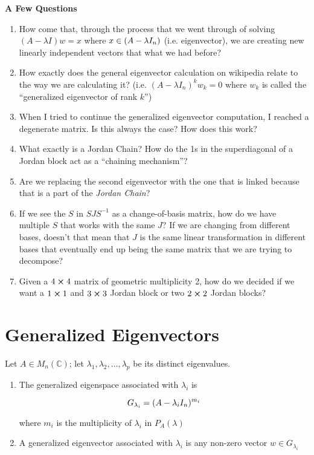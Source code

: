 \begin{tcolorbox}
	\textbf{A Few Questions}

	\begin{enumerate}
		\item How come that, through the process that we went through of solving $(A - \lambda I)w = x$ where $x \in \null(A - \lambda I_n)$ (i.e. eigenvector), we are creating new linearly independent vectors that what we had before?
		\item How exactly does the general eigenvector calculation on wikipedia relate to the way we are calculating it? (i.e. $(A - \lambda I_n)^k w_k = 0$ where $w_k$ is called the ``generalized eigenvector of rank $k$'')
		\item When I tried to continue the generalized eigenvector computation, I reached a degenerate matrix. Is this always the case? How does this work?
		\item What exactly is a Jordan Chain? How do the 1s in the superdiagonal of a Jordan block act as a ``chaining mechanism''?
		\item Are we replacing the second eigenvector with the one that is linked because that is a part of the \textit{Jordan Chain}?
		\item If we see the $S$ in $SJS^{-1}$ as a change-of-basis matrix, how do we have multiple $S$ that works with the same $J$? If we are changing from different bases, doesn't that mean that $J$ is the same linear transformation in different bases that eventually end up being the same matrix that we are trying to decompose?
		\item Given a $4 \cross 4$ matrix of geometric multiplicity 2, how do we decided if we want a $1\cross 1$ and $3 \cross 3$ Jordan block or two $2 \cross 2$ Jordan blocks?
	\end{enumerate}
\end{tcolorbox}

\section{Generalized Eigenvectors}

\begin{definition}
	Let $A \in M_n(\mathbb{C})$; let $\lambda_1, \lambda_2, \ldots, \lambda_p$ be its distinct eigenvalues.

	\begin{enumerate}[1)]
		\item The generalized eigenspace associated with $\lambda_i$ is
		
		\[G_{\lambda_i} = \null(A - \lambda_i I_n)^{m_i}\]

		where $m_i$ is the multiplicity of $\lambda_i$ in $P_A(\lambda)$

		\item A generalized eigenvector associated with $\lambda_i$ is any non-zero vector $w \in G_{\lambda_i}$
	\end{enumerate}
\end{definition}

